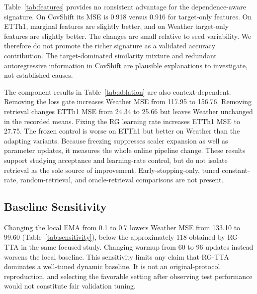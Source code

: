 \documentclass[conference]{IEEEtran}
\begin{document}
Table~\ref{tab:features} provides no consistent advantage for the dependence-aware signature. On CovShift its MSE is 0.918 versus 0.916 for target-only features. On ETTh1, marginal features are slightly better, and on Weather target-only features are slightly better. The changes are small relative to seed variability. We therefore do not promote the richer signature as a validated accuracy contribution. The target-dominated similarity mixture and redundant autoregressive information in CovShift are plausible explanations to investigate, not established causes.

\begin{table}[t]
\centering
\caption{Component study, iTransformer, $H=96$. The full controller is the marginal-signature configuration.}
\label{tab:ablation}

\end{table}

The component results in Table~\ref{tab:ablation} are also context-dependent. Removing the loss gate increases Weather MSE from 117.95 to 156.76. Removing retrieval changes ETTh1 MSE from 24.34 to 25.66 but leaves Weather unchanged in the recorded means. Fixing the RG learning rate increases ETTh1 MSE to 27.75. The frozen control is worse on ETTh1 but better on Weather than the adapting variants. Because freezing suppresses scaler expansion as well as parameter updates, it measures the whole online pipeline change. These results support studying acceptance and learning-rate control, but do not isolate retrieval as the sole source of improvement. Early-stopping-only, tuned constant-rate, random-retrieval, and oracle-retrieval comparisons are not present.

\subsection{Baseline Sensitivity}
\begin{table}[t]
\centering
\caption{Local Dyna-style baseline sensitivity under the causal batch protocol; iTransformer, $H=96$. $w$ is warmup updates.}
\label{tab:sensitivity}

\end{table}

Changing the local EMA from 0.1 to 0.7 lowers Weather MSE from 133.10 to 99.60 (Table~\ref{tab:sensitivity}), below the approximately 118 obtained by RG-TTA in the same focused study. Changing warmup from 60 to 96 updates instead worsens the local baseline. This sensitivity limits any claim that RG-TTA dominates a well-tuned dynamic baseline. It is not an original-protocol reproduction, and selecting the favorable setting after observing test performance would not constitute fair validation tuning.
\end{document}
